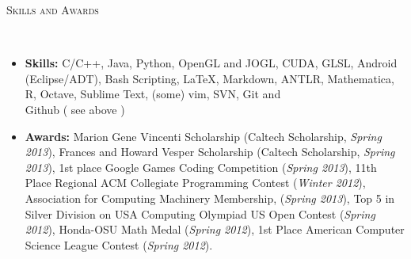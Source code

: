 \documentclass[9pt]{article}
\newenvironment{changemargin}[2]{%
  \begin{list}{}{%
    \setlength{\topsep}{0pt}%
    \setlength{\leftmargin}{#1}%
    \setlength{\rightmargin}{#2}%
    \setlength{\listparindent}{\parindent}%
    \setlength{\itemindent}{\parindent}%
    \setlength{\parsep}{\parskip}%
  }%
  \item[]}{\end{list}
}
\newcommand{\lineover}{
	\begin{changemargin}{-0.05in}{-0.05in}
		\vspace*{-8pt}
		\hrulefill \\
		\vspace*{-2pt}
	\end{changemargin}
}
\newcommand{\header}[1]{
	\begin{changemargin}{-0.5in}{-0.5in}
		\scshape{#1}\\
  	\lineover
	\end{changemargin}
}
\newenvironment{body} {
	\vspace*{-16pt}
	\begin{changemargin}{-0.25in}{-0.5in}
  }	
	{\end{changemargin}
}
\begin{document}
\header{Skills and Awards}
\smallskip
\begin{body}
	\vspace{14pt}
	
	\begin{itemize} \itemsep -0pt
	
	\item \textbf{Skills:} C/C++, Java, Python, OpenGL and JOGL, CUDA, GLSL, Android (Eclipse/ADT), Bash Scripting, \LaTeX, Markdown, ANTLR,  Mathematica, R, Octave, Sublime Text, (some) vim, SVN, Git and \\ Github ( see above )\\
	\medskip
	\item \textbf{Awards:} Marion Gene Vincenti Scholarship (Caltech Scholarship, \emph{Spring 2013}), 
	Frances and Howard Vesper Scholarship (Caltech Scholarship, \emph{Spring 2013}), 
	1st place Google Games Coding Competition (\emph{Spring 2013}), 
	11th Place Regional ACM Collegiate Programming Contest (\emph{Winter 2012}), 
	Association for Computing Machinery Membership, (\emph{Spring 2013}),
	Top 5 in Silver Division on USA Computing Olympiad US Open Contest (\emph{Spring 2012}),
	Honda-OSU Math Medal (\emph{Spring 2012}),
	1st Place American Computer Science League Contest (\emph{Spring 2012}).
	\end{itemize}
\end{body}
\end{document}
